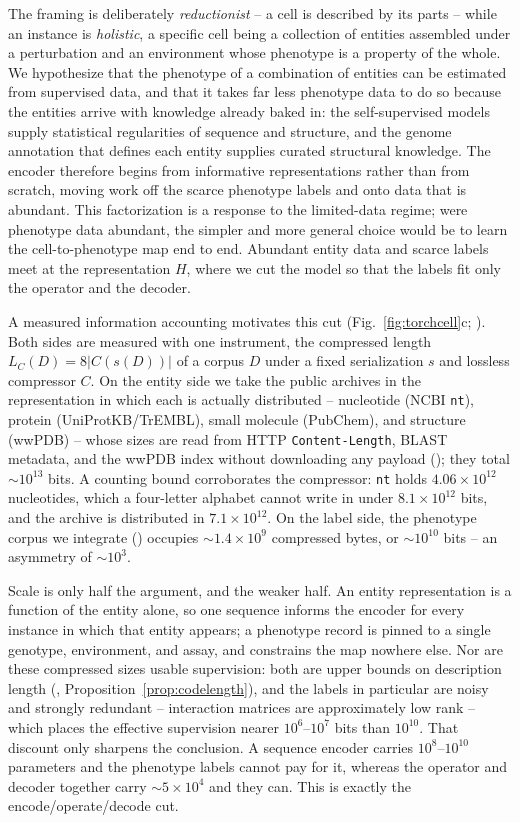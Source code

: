 The framing is deliberately \emph{reductionist} -- a cell is described by its parts -- while an
instance is \emph{holistic}, a specific cell being a collection of entities assembled under a
perturbation and an environment whose phenotype is a property of the whole. We hypothesize
that the phenotype of a combination of entities can be estimated from supervised data, and
that it takes far less phenotype data to do so because the entities arrive with knowledge
already baked in: the self-supervised models supply statistical regularities of sequence and
structure, and the genome annotation that defines each entity supplies curated structural
knowledge. The encoder therefore begins from informative representations rather than from
scratch, moving work off the scarce phenotype labels and onto data that is abundant. This
factorization is a response to the limited-data regime; were phenotype data abundant, the
simpler and more general choice would be to learn the cell-to-phenotype map end to end.
Abundant entity data and scarce labels meet at the representation $H$, where we cut the model
so that the labels fit only the operator and the decoder.

A measured information accounting motivates this cut (Fig.~\ref{fig:torchcell}c; ). Both sides are measured with one instrument, the compressed length
$L_C(D)=8\lvert C(s(D))\rvert$ of a corpus $D$ under a fixed serialization $s$ and lossless
compressor $C$. On the entity side we take the public archives in the representation in which
each is actually distributed -- nucleotide (NCBI \texttt{nt}), protein (UniProtKB/TrEMBL),
small molecule (PubChem), and structure (wwPDB) -- whose sizes are read from HTTP
\texttt{Content-Length}, BLAST metadata, and the wwPDB index without downloading any payload
(); they total ${\sim}10^{13}$ bits. A counting bound
corroborates the compressor: \texttt{nt} holds $4.06\times10^{12}$ nucleotides, which a
four-letter alphabet cannot write in under $8.1\times10^{12}$ bits, and the archive is
distributed in $7.1\times10^{12}$. On the label side, the phenotype corpus we integrate
() occupies ${\sim}1.4\times10^{9}$ compressed bytes, or
${\sim}10^{10}$ bits -- an asymmetry of ${\sim}10^{3}$.

Scale is only half the argument, and the weaker half. An entity representation is a function
of the entity alone, so one sequence informs the encoder for every instance in which that
entity appears; a phenotype record is pinned to a single genotype, environment, and assay, and
constrains the map nowhere else. Nor are these compressed sizes usable supervision: both are
upper bounds on description length (, Proposition~\ref{prop:codelength}),
and the labels in particular are noisy and strongly redundant -- interaction matrices are
approximately low rank -- which places the effective supervision nearer $10^{6}$--$10^{7}$ bits
than $10^{10}$. That discount only sharpens the conclusion. A sequence encoder carries
$10^{8}$--$10^{10}$ parameters and the phenotype labels cannot pay for it, whereas the operator
and decoder together carry ${\sim}5\times10^{4}$ and they can. This is exactly the
encode/operate/decode cut.

